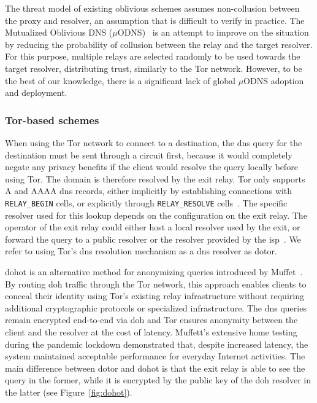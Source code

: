 The threat model of existing oblivious schemes assumes non-collusion between the
proxy and resolver, an assumption that is difficult to verify in practice. The
Mutualized Oblivious DNS ($\mu$ODNS)~\cite{kurihara2023muodns} is an attempt to
improve on the situation by reducing the probability of collusion between the
relay and the target resolver. For this purpose, multiple relays are selected
randomly to be used towards the target resolver, distributing trust, similarly
to the Tor network. However, to be the best of our knowledge, there is a
significant lack of global $\mu$ODNS adoption and deployment.

\subsubsection{Tor-based schemes}
\label{sec:bak:tor}
When using the Tor network to connect to a destination, the \ac{dns} query for
the destination must be sent through a circuit first, because it would
completely negate any privacy benefits if the client would resolve the query
locally before using Tor. The domain is therefore resolved by the exit relay.
Tor only supports A and AAAA \ac{dns} records, either implicitly by establishing
connections with \texttt{RELAY\_BEGIN} cells, or explicitly through
\texttt{RELAY\_RESOLVE} cells~\cite{TorSpecResolve}. The specific resolver used
for this lookup depends on the configuration on the exit relay. The operator of
the exit relay could either host a local resolver used by the exit, or forward
the query to a public resolver or the resolver provided by the
\ac{isp}~\cite{greschbach2016effect}. We refer to using Tor's \ac{dns} resolution
mechanism as a \ac{dns} resolver as \ac{dotor}.

\ac{dohot} is an alternative method for anonymizing queries introduced by
Muffet~\cite{DoHoT}. By routing \ac{doh} traffic through the Tor network, this
approach enables clients to conceal their identity using Tor's existing relay
infrastructure without requiring additional cryptographic protocols or
specialized infrastructure. The \ac{dns} queries remain encrypted end-to-end via
\ac{doh} and Tor ensures anonymity between the client and the resolver at the
cost of latency. Muffett's extensive home testing during the pandemic lockdown
demonstrated that, despite increased latency, the system maintained acceptable
performance for everyday Internet activities. The main difference between
\ac{dotor} and \ac{dohot} is that the exit relay is able to see the query in the
former, while it is encrypted by the public key of the \ac{doh} resolver in the
latter (see Figure~\ref{fig:dohot}). 

